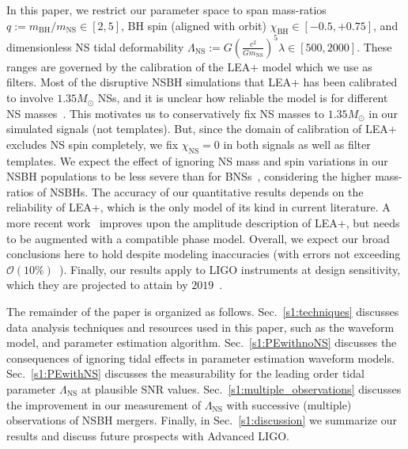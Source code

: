 \documentclass[aps,prd,amsmath,floats,floatfix, twocolumn,
superscriptaddress,nofootinbib,showpacs]{revtex4-1}
\newcommand{\lambdans}{\Lambda_\mathrm{NS}}
\newcommand{\chibh}{\chi_\mathrm{BH}}
\newcommand{\chins}{\chi_\mathrm{NS}}
\newcommand{\mbh}{m_\mathrm{BH}}
\newcommand{\mns}{m_\mathrm{NS}}
\begin{document}
In this paper, we restrict our parameter space to span mass-ratios
$q:=\mbh/\mns\in[2,5]$, BH spin (aligned with orbit)
$\chibh\in[-0.5, +0.75]$, and dimensionless NS tidal deformability 
$\lambdans:= G\left(\frac{c^2}{G \mns}\right)^5\lambda \in[500, 2000]$.
These ranges are governed by the calibration of the LEA+ model which we use as
filters. 
% 
Most of the disruptive NSBH simulations that LEA+ has been calibrated to
involve $1.35M_\odot$ NSs, and it is unclear how reliable the model is 
for different NS masses~\cite{Lackey:2013axa,Pannarale:2015jka}. This
motivates us to conservatively fix NS masses to $1.35M_\odot$ in our 
simulated signals (not templates). But, since the domain of calibration of
LEA+ excludes NS spin completely, we fix $\chins=0$ in both signals as well as
filter templates. We expect the effect of ignoring NS mass and spin variations
in our NSBH populations to be less severe than for
BNSs~\cite{Agathos:2015a}, considering the higher mass-ratios of NSBHs.
% 
The accuracy of our quantitative results depends on the reliability of LEA+,
which is the only model of its kind in current literature. A more recent 
work~\cite{Pannarale:2015jka} improves upon the amplitude description of LEA+,
but needs to be augmented with a compatible phase model. Overall, we expect
our broad conclusions here to hold despite modeling inaccuracies (with errors
not exceeding $\mathcal{O}(10\%)$~\cite{Pannarale:2015jka}).
% 
Finally, our results apply to LIGO instruments at design sensitivity,
which they are projected to attain by $2019$~\cite{Shoemaker2009,
Abbott:2016wya}.


The remainder of the paper is organized as follows. 
Sec.~\ref{s1:techniques} discusses data analysis techniques and resources 
used in this paper, such as the waveform model, and parameter estimation 
algorithm.
Sec.~\ref{s1:PEwithnoNS} discusses the consequences of ignoring tidal 
effects in parameter estimation waveform models.
Sec.~\ref{s1:PEwithNS} discusses the measurability for the leading order
tidal parameter $\lambdans$ at plausible SNR values.
Sec.~\ref{s1:multiple_observations} discusses the improvement in our
measurement of $\lambdans$ with successive (multiple) observations of
NSBH mergers.
Finally, in Sec.~\ref{s1:discussion} we summarize our results and discuss
future prospects with Advanced LIGO.





\end{document}
